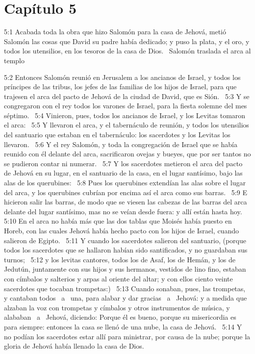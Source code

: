 				\section*{Capítulo 5}
					
					5:1 Acabada toda la obra que hizo Salomón para la casa de Jehová, metió Salomón las cosas que David su padre había dedicado; y puso la plata, y el oro, y todos los utensilios, en los tesoros de la casa de Dios.  
					Salomón traslada el arca al templo  
					
					5:2 Entonces Salomón reunió en Jerusalem a los ancianos de Israel, y todos los príncipes de las tribus, los jefes de las familias de los hijos de Israel, para que trajesen el arca del pacto de Jehová de la ciudad de David, que es Sión.  
					5:3 Y se congregaron con el rey todos los varones de Israel, para la fiesta solemne del mes séptimo.  
					5:4 Vinieron, pues, todos los ancianos de Israel, y los Levitas tomaron el arca:  
					5:5 Y llevaron el arca, y el tabernáculo de reunión, y todos los utensilios del santuario que estaban en el tabernáculo: los sacerdotes y los Levitas los llevaron.  
					5:6 Y el rey Salomón, y toda la congregación de Israel que se había  reunido con él delante del arca, sacrificaron ovejas y bueyes, que por ser tantos no se pudieron contar ni numerar.  
					5:7 Y los sacerdotes metieron el arca del pacto de Jehová en su lugar, en el santuario de la casa, en el lugar santísimo, bajo las alas de los querubines:  
					5:8 Pues los querubines extendían las alas sobre el lugar del arca, y los querubines cubrían por encima así el arca como sus barras.  
					5:9 E hicieron salir las barras, de modo que se viesen las cabezas de las barras del arca delante del lugar santísimo, mas no se veían desde fuera: y allí están hasta hoy.  
					5:10 En el arca no había más que las dos tablas que Moisés había puesto en Horeb, con las cuales Jehová había hecho pacto con los hijos de Israel, cuando salieron de Egipto.  
					5:11 Y cuando los sacerdotes salieron del santuario, (porque todos los sacerdotes que se hallaron habían sido santificados, y no guardaban sus turnos;  
					5:12 y los levitas cantores, todos los de Asaf, los de Hemán, y los de Jedutún, juntamente con sus hijos y sus hermanos, vestidos de lino fino, estaban con címbalos y salterios y arpas al oriente del altar; y con ellos ciento veinte sacerdotes que tocaban trompetas:)  
					5:13 Cuando sonaban, pues, las trompetas, y cantaban todos  a  una, para alabar y dar gracias  a  Jehová: y a medida que alzaban la voz con trompetas y címbalos y otros instrumentos de música, y alababan  a  Jehová, diciendo: Porque él es bueno, porque su misericordia es para siempre: entonces la casa se llenó de una nube, la casa de Jehová.  
					5:14 Y no podían los sacerdotes estar allí para ministrar, por causa de la nube; porque la gloria de Jehová había llenado la casa de Dios. 
